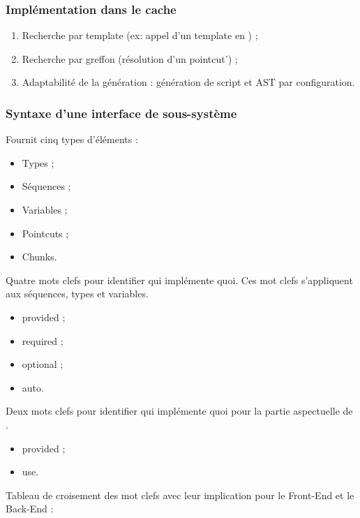 \documentclass[]{beamer}
\begin{document}
\begin{frame}
\frametitle{Implémentation dans le cache}
\begin{enumerate}[<+->]
    \item Recherche par template (ex: appel d'un template en \rtx) ;
    \item Recherche par greffon (résolution d'un pointcut') ;
    \item Adaptabilité de la génération :
        génération de script et AST par configuration.
\end{enumerate}
\end{frame}

\begin{frame}
\frametitle{Syntaxe d'une interface de sous-système}
 {
    Fournit cinq types d'éléments :
    \begin{itemize}
        \item Types ;
        \item Séquences ;
        \item Variables ;
        \item Pointcuts ;
        \item Chunks.
    \end{itemize}
}
 {
    Quatre mots clefs pour identifier qui implémente quoi.
    Ces mot clefs s'appliquent aux séquences, types et variables.
    \begin{itemize}
        \item provided ;
        \item required ;
        \item optional ;
        \item auto.
    \end{itemize}
}
 {
    Deux mots clefs pour identifier qui implémente quoi pour la partie
    aspectuelle de \rtx.
    \begin{itemize}
        \item provided ;
        \item use.
    \end{itemize}
}
 {
    Tableau de croisement des mot clefs avec leur implication pour le
    Front-End et le Back-End :
}

\end{frame}
\end{document}
